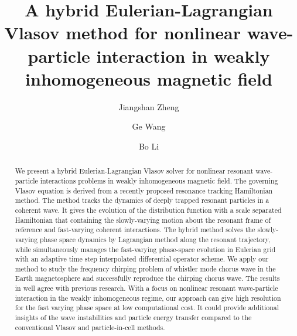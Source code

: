 \documentclass[times,12pt,3p,longtitle]{elsarticle}
\begin{document}
\begin{frontmatter}
\title{A hybrid Eulerian-Lagrangian Vlasov method for nonlinear wave-particle interaction in weakly inhomogeneous magnetic field}
\author[1]{Jiangshan Zheng}
\author[2,3]{Ge Wang}
\author[1]{Bo Li}

\address[1]{School of Physics, Beihang University, Beijing, Beijing 100191, China}
\address[2]{Institute for Fusion Studies, University of Texas at Austin, Austin, Texas, 78712, USA}
\address[3]{Center for Plasma Theory and Computation, University of Wisconsin at Madison, Madison, Wisconsin 53706, USA}
\begin{abstract}
  We present a hybrid Eulerian-Lagrangian Vlasov solver for nonlinear resonant wave-particle interactions problems in weakly inhomogeneous magnetic field.
  The governing Vlasov equation is derived from a recently proposed resonance tracking Hamiltonian method. 
  The method tracks the dynamics of deeply trapped resonant particles in a coherent wave. 
  It gives the evolution of the distribution function with a scale separated Hamiltonian that containing the slowly-varying motion about the resonant frame of reference and fast-varying coherent interactions.
  The hybrid method solves the slowly-varying phase space dynamics by Lagrangian method along the resonant trajectory, while simultaneously manages the fast-varying phase-space evolution in Eulerian grid with an adaptive time step interpolated differential operator scheme.
  We apply our method to study the frequency chirping problem of whistler mode chorus wave in the Earth magnetosphere and successfully reproduce the chirping chorus wave. 
  The results in well agree with previous research. 
  With a focus on nonlinear resonant wave-particle interaction in the weakly inhomogeneous regime, our approach can give high resolution for the fast varying phase space at low computational cost.  
  It could provide additional insights of the wave instabilities and particle energy transfer compared to the conventional Vlasov and particle-in-cell methods.
\end{abstract}
\end{frontmatter}

\clearpage

%
\end{document}
